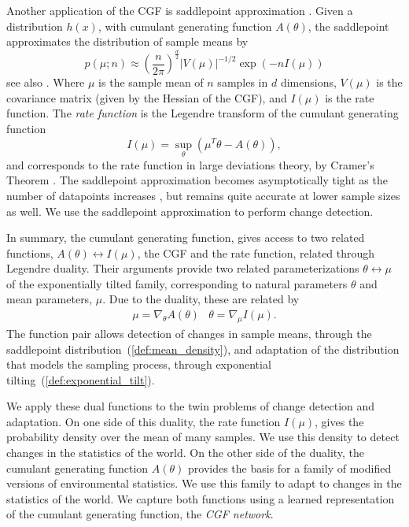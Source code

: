 \documentclass{article}      %
\begin{document}
Another application of the CGF is saddlepoint approximation \cite{daniels_saddlepoint_1954,barndorff-nielsen_edgeworth_1979}.
Given a distribution $h(x)$, with cumulant generating function $A(\theta)$, the saddlepoint approximates the distribution of sample means by
\begin{equation}
  p(\mu; n) \approx \left( \frac{n}{2\pi} \right)^{\frac{d}{2}} |V(\mu)|^{-1/2} \exp(-n I(\mu)) \label{def:mean_density}
\end{equation}
see also \cite{reid_saddlepoint_1988,mccullagh2018tensor}.
Where $\mu$ is the sample mean of $n$ samples in $d$ dimensions, $V(\mu)$ is the covariance matrix (given by the Hessian of the CGF), and $I(\mu)$ is the rate function.
The \textit{rate function} is the Legendre transform of the cumulant generating function
\begin{equation}
  I(\mu) = \sup_{\theta}(\mu^T \theta  - A(\theta) ), \label{eq:legendre_transform}
\end{equation}
and corresponds to the rate function in large deviations theory, by Cramer's Theorem \cite{dembo2009large}.
The saddlepoint approximation becomes asymptotically tight as the number of datapoints increases \cite{iltis_sharp_1995,chaganty_multidimensional_1986}, but remains quite accurate at lower sample sizes \cite{davison_saddlepoint_1988,ronchetti_empirical_1994} as well.
We use the saddlepoint approximation to perform change detection.

In summary, the cumulant generating function, gives access to two related functions, $A(\theta) \leftrightarrow I(\mu)$, the CGF and the rate function, related through Legendre duality.
Their arguments provide two related parameterizations $\theta \leftrightarrow \mu$ of the exponentially tilted family, corresponding to natural parameters $\theta$ and mean parameters, $\mu$.
Due to the duality, these are related by 
\begin{eqnarray}
  \mu = \nabla_\theta A(\theta) & \theta = \nabla_\mu I(\mu). \label{eq:duality_relations}
\end{eqnarray}
The function pair allows detection of changes in sample means, through the saddlepoint distribution~(\ref{def:mean_density}), and adaptation of the distribution that models the sampling process, through exponential tilting~(\ref{def:exponential_tilt}).

We apply these dual functions to the twin problems of change detection and adaptation.
On one side of this duality, the rate function $I(\mu)$, gives the probability density over the mean of many samples.
We use this density to detect changes in the statistics of the world.
On the other side of the duality, the cumulant generating function $A(\theta)$ provides the basis for a family of modified versions of environmental statistics.
We use this family to adapt to changes in the statistics of the world.
We capture both functions using a learned representation of the cumulant generating function, the \textit{CGF network}.
\end{document}
